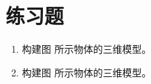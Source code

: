 \section*{练习题}
\begin{enumerate}

\item 
\begin{question}
构建图 所示物体的三维模型。

\end{question}
\item 
\begin{question}
构建图 所示物体的三维模型。
\end{question}
\end{enumerate}
\endinput